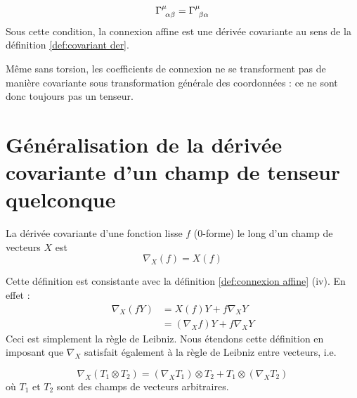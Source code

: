 \begin{equation}
    \Gamma\indices{^\mu_{\!\alpha\beta}} = \Gamma\indices{^\mu_{\!\beta \alpha}}
\end{equation}
Sous cette condition, la connexion affine est une dérivée covariante au sens de la définition \ref{def:covariant der}.
\begin{rmk}
    Même sans torsion, les coefficients de connexion ne se transforment pas de manière covariante sous transformation générale des coordonnées : ce ne sont donc toujours pas un tenseur. 
\end{rmk}



\section{Généralisation de la dérivée covariante d'un champ de tenseur quelconque}
\begin{theoremframe}
    \begin{defi}
        \label{dérivée covariante 0-forme}
        La dérivée covariante d'une fonction lisse $f$ ($0$-forme) le long d'un champ de vecteurs $X$ est 
        \begin{equation}
            \nabla_{X}(f) = X(f)
        \end{equation}
    \end{defi}
\end{theoremframe}
Cette définition est consistante avec la définition \ref{def:connexion affine} (iv). En effet :
\begin{align*}
        \nabla_{X}(fY) &= X(f)Y + f\nabla_X Y\\
        &= (\nabla_X f)Y + f\nabla_X Y
    \label{regle de Liebniz}
\end{align*}
Ceci est simplement la règle de Leibniz. Nous étendons cette définition en imposant que $\nabla_X$ satisfait également à la règle de Leibniz entre vecteurs, i.e.

\begin{equation}
    \nabla_X(T_1 \otimes T_2) = (\nabla_XT_1)\otimes T_2 + T_1 \otimes (\nabla_X T_2)
    \label{Leibniz tenseur arbitraire}
\end{equation}
où $T_1$ et $T_2$ sont des champs de vecteurs arbitraires. 

